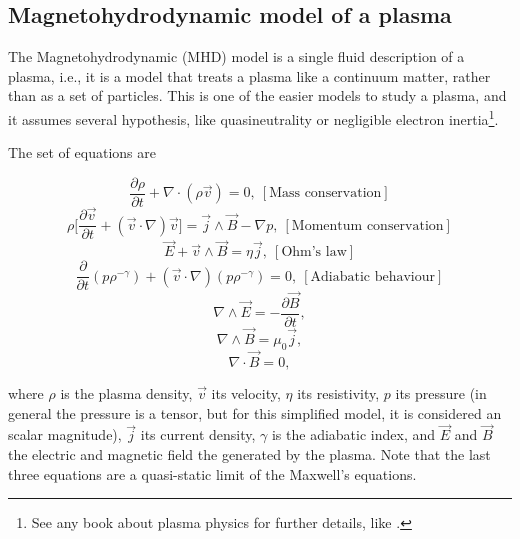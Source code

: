 \documentclass[a4paper,12pt,oneside]{book}
\newcommand{\p}{\partial}
\begin{document}
\subsection{Magnetohydrodynamic model of a plasma}
The Magnetohydrodynamic (MHD) model is a single fluid description of a plasma, i.e., it is a model that treats a plasma like a continuum matter, rather than as a set of particles. This is one of the easier models to study a plasma, and it assumes several hypothesis, like quasineutrality or negligible electron inertia\footnote{See any book about plasma physics for further details, like \cite{Chen}.}.

The set of equations are

\begin{equation}
\dfrac{\p \rho}{\p t}+\nabla \cdot (\rho \vec{v})=0, \ [\text{Mass conservation}] 
\end{equation}
\begin{equation} \label{momentum cons}
\rho \Big[\dfrac{\p \vec{v}}{\p t}+(\vec{v} \cdot \nabla)\vec{v} \Big]=\vec{j} \wedge \vec{B} -\nabla p, \ [\text{Momentum  conservation}] 
\end{equation}
\begin{equation}
\vec{E} +\vec{v} \wedge \vec{B}=\eta \vec{j}, \  [\text{Ohm's  law}] 
 \end{equation}
 \begin{equation}
\dfrac{\p}{\p t}(p \rho^{-\gamma})+(\vec{v} \cdot \nabla) (p \rho^{-\gamma})=0, \ [\text{Adiabatic  behaviour}] 
\end{equation}
\begin{equation} \label{faraday}
\nabla \wedge \vec{E}=- \dfrac{\p \vec{B}}{\p t},  
\end{equation}
\begin{equation}\label{ampere}
\nabla \wedge \vec{B}=\mu_0 \vec{j}, 
\end{equation}
\begin{equation} \label{nablaBnulo}
\nabla \cdot \vec{B}=0, 
\end{equation}


where $\rho$ is the plasma density, $\vec{v}$ its velocity, $\eta$ its resistivity, $p$ its pressure (in general the pressure is a tensor, but for this simplified model, it is considered an scalar magnitude), $\vec{j}$ its current density, $\gamma$ is the adiabatic index, and $\vec{E}$ and $\vec{B}$ the electric and magnetic field the generated by the plasma. Note that the last three equations are a quasi-static limit of the Maxwell's equations.
\end{document}
